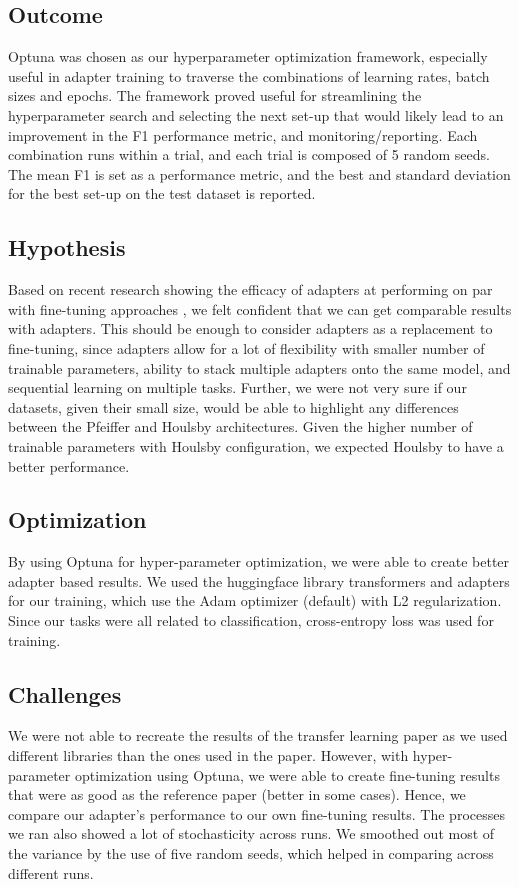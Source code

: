 \documentclass[10pt,twocolumn,letterpaper]{article}
\begin{document}
\subsection{Outcome} Optuna was chosen as our hyperparameter optimization framework, especially useful in adapter training to traverse the combinations of learning rates, batch sizes and epochs. The framework proved useful for streamlining the hyperparameter search and selecting the next set-up that would likely lead to an improvement in the F1 performance metric, and monitoring/reporting. Each combination runs within a trial, and each trial is composed of 5 random seeds. The mean F1 is set as a performance metric, and the best and standard deviation for the best set-up on the test dataset is reported.  

\subsection{Hypothesis} Based on recent research showing the efficacy of adapters at performing on par with fine-tuning approaches \cite{houlsby2019parameter}, we felt confident that we can get comparable results with adapters. This should be enough to consider adapters as a replacement to fine-tuning, since adapters allow for a lot of flexibility with smaller number of trainable parameters, ability to stack multiple adapters onto the same model, and sequential learning on multiple tasks. Further, we were not very sure if our datasets, given their small size, would be able to highlight any differences between the Pfeiffer and Houlsby architectures. Given the higher number of trainable parameters with Houlsby configuration, we expected Houlsby to have a better performance.

\subsection{Optimization} By using Optuna for hyper-parameter optimization, we were able to create better adapter based results. We used the huggingface library transformers and adapters for our training, which use the Adam optimizer (default) with L2 regularization. Since our tasks were all related to classification, cross-entropy loss was used for training. 

\subsection{Challenges} We were not able to recreate the results of the transfer learning paper \cite{gururangan2020dont} as we used different libraries than the ones used in the paper. However, with hyper-parameter optimization using Optuna, we were able to create fine-tuning results that were as good as the reference paper (better in some cases). Hence, we compare our adapter's performance to our own fine-tuning results. The processes we ran also showed a lot of stochasticity across runs. We smoothed out most of the variance by the use of five random seeds, which helped in comparing across different runs.
\end{document}
